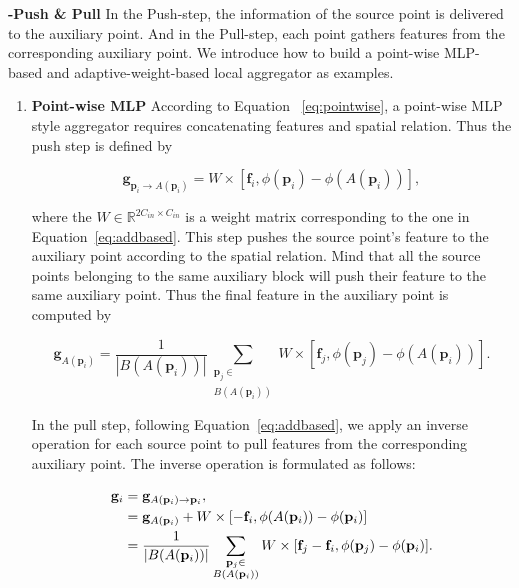 \documentclass[journal]{IEEEtran}
\begin{document}
\noindent
{\bf -Push \& Pull} In the Push-step, the information of the source point is delivered to the auxiliary point. And in the Pull-step, each point gathers features from the corresponding auxiliary point. We introduce how to build a point-wise MLP-based and adaptive-weight-based local aggregator as examples.

\begin{enumerate}
    \item {\bf Point-wise MLP} According to Equation ~\ref{eq:pointwise}, a point-wise MLP style aggregator requires concatenating features and spatial relation. Thus the push step is defined by

    \begin{equation}
        \mathbf{g}_{\mathbf{p}_i\to A(\mathbf{p}_i)}=W\times[\mathbf{f}_i, \phi(\mathbf{p}_i)-\phi(A(\mathbf{p}_i))]\label{eq:push},
    \end{equation}

    \noindent
    where the $W\in\mathbb{R}^{2C_{in}\times C_{in}}$ is a weight matrix corresponding to the one in Equation~\ref{eq:addbased}. This step pushes the source point's feature to the auxiliary point according to the spatial relation. Mind that all the source points belonging to the same auxiliary block will push their feature to the same auxiliary point. Thus the final feature in the auxiliary point is computed by
    
    \small
    \begin{equation}
        \mathbf{g}_{A(\mathbf{p}_i)}=\frac{1}{|B(A(\mathbf{p}_i))|} \sum_{\substack{\mathbf{p}_j\in \\B(A(\mathbf{p}_i))}}{W\times[\mathbf{f}_j, \phi(\mathbf{p}_j)-\phi(A(\mathbf{p}_i))]}.
    \end{equation}
    
    \noindent
    In the pull step, following Equation~\ref{eq:addbased}, we apply an inverse operation for each source point to pull features from the corresponding auxiliary point. The inverse operation is formulated as follows:
    
    \small
    \begin{align}
        \mathbf{g}_i&=\mathbf{g}_{A(\mathbf{p}_i)\to \mathbf{p}_i}, \notag\\
        &=\mathbf{g}_{A(\mathbf{p}_i)}+ W\times[-\mathbf{f}_i, \phi(A(\mathbf{p}_i))-\phi(\mathbf{p}_i)]\notag\\
        &=\frac{1}{|B(A(\mathbf{p}_i))|}\sum_{\substack{\mathbf{p}_j\in \\B(A(\mathbf{p}_i))}}{W\times[\mathbf{f}_j-\mathbf{f}_i, \phi(\mathbf{p}_j)-\phi(\mathbf{p}_i)]}\label{eq:assign}.
    \end{align}
    

\end{enumerate}
\end{document}
